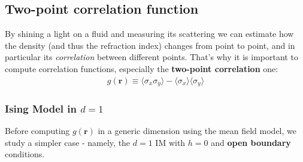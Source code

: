 \documentclass[../../main.tex]{subfiles}
\begin{document}
\subsection{Two-point correlation function}
By shining a light on a fluid and measuring its scattering we can estimate how the density (and thus the refraction index) changes from point to point, and in particular its \textit{correlation} between different points. That's why it is important to compute correlation functions, especially the \textbf{two-point correlation} one:
\begin{align*}
    g(\bm{r}) \equiv \langle \sigma_x \sigma_y \rangle - \langle \sigma_x \rangle \langle \sigma_y \rangle
\end{align*} 

\subsubsection{Ising Model in $d=1$}
Before computing $g(\bm{r})$ in a generic dimension using the mean field model, we study a simpler case - namely, the $d=1$ IM with $h=0$ and \textbf{open boundary} conditions. 
\end{document}
